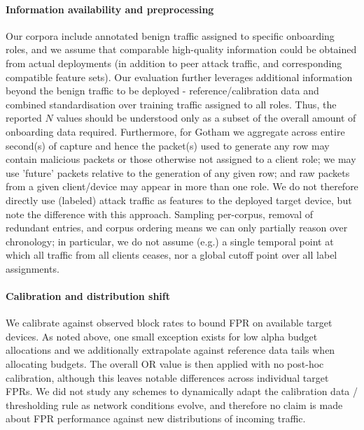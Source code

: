 \paragraph{Information availability and preprocessing} 
Our corpora include annotated benign traffic assigned to specific onboarding roles, and we assume that comparable high-quality information could be obtained from actual deployments (in addition to peer attack traffic, and corresponding compatible feature sets). Our evaluation further leverages additional information beyond the benign traffic to be deployed - reference/calibration data and combined standardisation over training traffic assigned to all roles. Thus, the reported $N$ values should be understood only as a subset of the overall amount of onboarding data required. Furthermore, for Gotham we aggregate across entire second(s) of capture and hence the packet(s) used to generate any row may contain malicious packets or those otherwise not assigned to a client role; we may use 'future' packets relative to the generation of any given row; and raw packets from a given client/device may appear in more than one role. We do not therefore directly use (labeled) attack traffic as features to the deployed target device, but note the difference with this approach. Sampling per-corpus, removal of redundant entries, and corpus ordering means we can only partially reason over chronology; in particular, we do not assume (e.g.) a single temporal point at which all traffic from all clients ceases, nor a global cutoff point over all label assignments.

\paragraph{Calibration and distribution shift} 
We calibrate against observed block rates to bound FPR on available target devices. As noted above, one small exception exists for low alpha budget allocations and we additionally extrapolate against reference data tails when allocating budgets. The overall OR value is then applied with no post-hoc calibration, although this leaves notable differences across individual target FPRs. We did not study any schemes to dynamically adapt the calibration data / thresholding rule as network conditions evolve, and therefore no claim is made about FPR performance against new distributions of incoming traffic.

